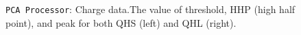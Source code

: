 \documentclass[12pt]{article}
\begin{document}
\begin{figure}
\centering
\noindent{}
  \caption{\centering \texttt{PCA Processor}: Charge data.\hspace{\textwidth}The value of threshold, HHP (high half point), and peak for both QHS (left) and QHL (right).}
  \label{fig:pca4}
\end{figure}
\end{document}
